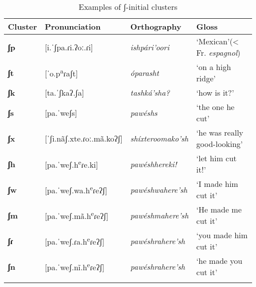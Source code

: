 \begin{table}
\caption{Examples of ʃ-initial clusters}\label{SCexamplesʃ}
\begin{tabularx}{\textwidth}{lllQ}
\lsptoprule
\textbf{Cluster}&\textbf{Pronunciation}&\textbf{Orthography}&\textbf{Gloss}\\
\midrule
\textbf{ʃp}&[i.ˈʃpa.ɾi.ʔoː.ɾi] & \textit{ishpári'oori}&`Mexican'\newline (< Fr. \textit{espagnol})\\
\textbf{ʃt}&[ˈo.p\textsuperscript{a}ɾaʃt]&\textit{óparasht}& `on a high ridge'\\
\textbf{ʃk}&[ta.ˈʃkaʔ.ʃa]&\textit{tashká'sha?}&`how is it?'\\
\textbf{ʃs}&[pa.ˈweʃs]&\textit{pawéshs}&`the one he cut'\\
\textbf{ʃx}&[ˈʃi.nãʃ.xte.ɾoː.mã.koʔʃ]&\textit{shíxteroomako'sh}&`he was really good-looking'\\
\textbf{ʃh}&[pa.ˈweʃ.h\textsuperscript{e}ɾe.ki]&\textit{pawéshhereki!}&`let him cut it!'\\
\textbf{ʃw}&[pa.ˈweʃ.wa.h\textsuperscript{e}ɾeʔʃ]&\textit{pawéshwahere'sh}&`I made him cut it'\\
\textbf{ʃm}&[pa.ˈweʃ.mã.h\textsuperscript{e}ɾeʔʃ]&\textit{pawéshmahere'sh}&`He made me cut it'\\
\textbf{ʃɾ}&[pa.ˈweʃ.ɾa.h\textsuperscript{e}ɾeʔʃ]&\textit{pawéshrahere'sh}&`you made him cut it'\\
\textbf{ʃn}&[pa.ˈweʃ.nĩ.h\textsuperscript{e}ɾeʔʃ]&\textit{pawéshrahere'sh}&`he made you cut it'\\
\lspbottomrule
\end{tabularx}
\end{table}


